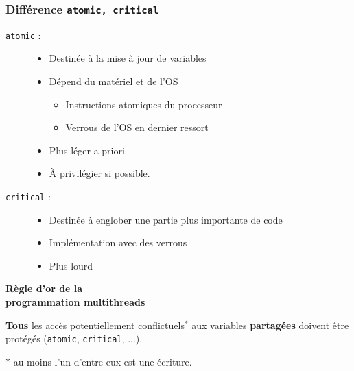 \documentclass{beamer}
\begin{document}
\begin{frame}[fragile]
  \frametitle{Différence {\tt atomic, critical}}

\begin{description}

\item[{\tt atomic} :]
  \begin{itemize}
    \item Destinée à la mise à jour de variables 
    \item Dépend du matériel et de l'OS
      \begin{itemize}
      \item Instructions atomiques du processeur
      \item Verrous de l'OS en dernier ressort
      \end{itemize}
    \item<2-> Plus léger a priori
    \item<3> \alert{À privilégier si possible.}
  \end{itemize}

\bigskip

\item[{\tt critical} :]
  \begin{itemize}
    \item Destinée à englober une partie plus importante de code
    \item Implémentation avec des verrous
    \item<2-> Plus lourd
  \end{itemize}

\end{description}
\end{frame}


\begin{frame}[label=golden_rule]

  \begin{center}
    \Huge \bf \alert{Règle d'or de la \\ programmation multithreads}
  \end{center}

  \bigskip
  
  {\Large \textbf{Tous} les accès potentiellement conflictuels${}^*$
    aux variables \textbf{partagées} doivent être protégés (\texttt{atomic},
    \texttt{critical}, ...).}

  \bigskip

  $*$ au moins l'un d'entre eux est une écriture.  
\end{frame}
\end{document}
